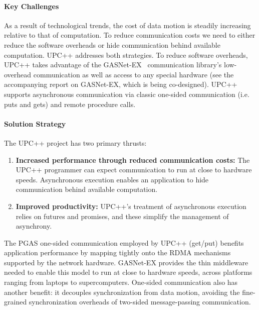 \paragraph{Key  Challenges}

As a result of technological trends, the cost of data motion is steadily increasing relative to that of computation.  To reduce communication costs we need to 
either reduce the software overheads or hide  communication behind available computation. UPC++ addresses both strategies.
To reduce software overheads, UPC++ takes advantage of the GASNet-EX~\cite{gasnet-lcpc18,gasnet-site}
communication library's 
low-overhead communication as well as access to any special hardware
(see the accompanying report on GASNet-EX, which is being co-designed).
UPC++ supports asynchronous communication via classic one-sided communication
(i.e. puts and gets) and remote procedure calls.



\paragraph{Solution Strategy}

The UPC++ project has two primary thrusts:
\begin{enumerate}
\item \textbf{Increased performance through reduced communication costs:} The
UPC++ programmer can expect communication to run at close to hardware speeds.
Asynchronous execution enables an application to hide communication behind
available computation.

\item \textbf{Improved productivity:}  UPC++'s treatment of asynchronous
execution relies on futures and promises, and these simplify the management of
asynchrony.

\end{enumerate}

The PGAS one-sided communication employed by UPC++ (get/put)
benefits application  performance by mapping tightly onto the RDMA mechanisms
supported by the network hardware. GASNet-EX provides the
thin middleware
needed to enable this model to run at close to hardware speeds, across platforms ranging from laptops to supercomputers.
One-sided communication also has another benefit:
it decouples synchronization from data motion,
avoiding the fine-grained synchronization overheads of two-sided message-passing communication.

